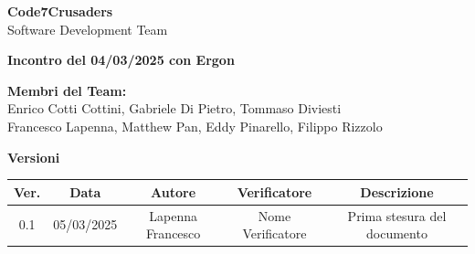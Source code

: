 \documentclass{article}
\begin{document}
\begin{titlepage}
    {\Huge \textbf{Code7Crusaders}}\\
    \vspace{0.5cm}
    {\Large Software Development Team}\\
    \vspace{2cm}
    
    {\large \textbf{Incontro del 04/03/2025 con Ergon}}\\ %
    \vspace{5cm}                           %
    
    
    \textbf{Membri del Team:}\\
    Enrico Cotti Cottini, Gabriele Di Pietro, Tommaso Diviesti \\
    Francesco Lapenna, Matthew Pan, Eddy Pinarello, Filippo Rizzolo \\
    \vspace{0.5cm}
    
    \vspace{1cm}
\end{titlepage}



\newpage
\begin{table}[h!]
\centering
\textbf{Versioni} \\ %
\vspace{2mm} %
\begin{tabular}{|c|c|c|c|c|}
    \hline
    \textbf{Ver.} & \textbf{Data} & \textbf{Autore} & \textbf{Verificatore} & \textbf{Descrizione} \\
    \hline
    0.1 & 05/03/2025 & Lapenna Francesco & Nome Verificatore & Prima stesura del documento \\ 
    \hline                                  %
\end{tabular}
\end{table}



\newpage
\tableofcontents
\end{document}
